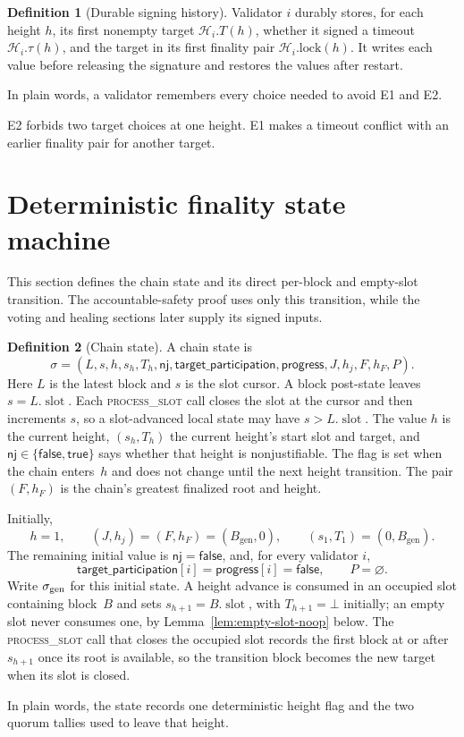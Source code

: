 \ifx\litemode\undefined\documentclass{article}\fi
\theoremstyle{plain}
\theoremstyle{definition}
\newtheorem{definition}{Definition}
\theoremstyle{remark}
\newcommand{\targetParticipation}{\mathsf{target\_participation}}
\newcommand{\progressBit}{\mathsf{progress}}
\newcommand{\genesis}{B_{\mathrm{gen}}}
\newcommand{\nj}{\mathsf{nj}}
\newcommand{\slot}{\operatorname{\mathrm{slot}}}
\begin{document}
\begin{definition}[Durable signing history]\label{def:signing-history}
Validator \(i\) durably stores, for each height \(h\), its first nonempty
target \(\mathcal H_i.T(h)\), whether it signed a timeout
\(\mathcal H_i.\tau(h)\), and the target in its first finality pair
\(\mathcal H_i.\mathrm{lock}(h)\).  It writes each value before releasing the
signature and restores the values after restart.

In plain words, a validator remembers every choice needed to avoid E1 and E2.
\end{definition}

E2 forbids two target choices at one height.  E1 makes a timeout conflict
with an earlier finality pair for another target.

\section{Deterministic finality state machine}\label{sec:state-machine}

This section defines the chain state and its direct per-block and empty-slot
transition.  The accountable-safety proof uses only this transition, while
the voting and healing sections later supply its signed inputs.

\begin{definition}[Chain state]\label{def:chain-state}
A chain state is
\[
  \sigma=(L,s,h,s_h,T_h,\nj,\targetParticipation,\progressBit,
          J,h_j,F,h_F,P).
\]
Here \(L\) is the latest block and \(s\) is the slot cursor.  A block
post-state leaves \(s=L.\slot\).  Each \textsc{process\_slot} call closes the
slot at the cursor and then increments \(s\), so a slot-advanced local state
may have \(s>L.\slot\).  The value \(h\) is the current height,
\((s_h,T_h)\) the current height's start slot and target, and
\(\nj\in\{\mathsf{false},\mathsf{true}\}\) says whether that height is
nonjustifiable.  The flag is set when the chain enters~\(h\) and does not
change until the next height transition.  The pair \((F,h_F)\) is the
chain's greatest finalized root and height.

Initially,
\[
 h=1,\qquad
 (J,h_j)=(F,h_F)=(\genesis,0),\qquad
 (s_1,T_1)=(0,\genesis).
\]
The remaining initial value is \(\nj=\mathsf{false}\), and, for every
validator \(i\),
\[
 \targetParticipation[i]=\progressBit[i]=\mathsf{false},\qquad
 P=\varnothing.
\]
Write \(\sigma_{\rm gen}\) for this initial state.  A height advance is
consumed in an occupied slot containing block~\(B\) and sets
\(s_{h+1}=B.\slot\), with \(T_{h+1}=\bot\) initially; an empty slot
never consumes one, by Lemma~\ref{lem:empty-slot-noop} below.  The
\textsc{process\_slot} call that closes the occupied
slot records the first block at or after~\(s_{h+1}\) once its root is
available, so the transition block becomes the new target when its slot
is closed.

In plain words, the state records one deterministic height flag and the two
quorum tallies used to leave that height.
\end{definition}
\end{document}
